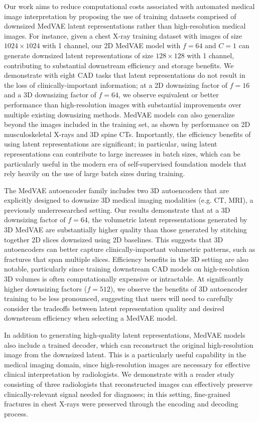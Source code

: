 Our work aims to reduce computational costs associated with automated medical image interpretation by proposing the use of training datasets comprised of downsized MedVAE latent representations rather than high-resolution medical images. For instance, given a chest X-ray training dataset with images of size $1024 \times 1024$ with 1 channel, our 2D MedVAE model with $f=64$ and $C=1$ can generate downsized latent representations of size $128 \times 128$ with 1 channel, contributing to substantial downstream efficiency and storage benefits. We demonstrate with eight CAD tasks that latent representations do not result in the loss of clinically-important information; at a 2D downsizing factor of $f=16$ and a 3D downsizing factor of $f=64$, we observe equivalent or better performance than high-resolution images with substantial improvements over multiple existing downsizing methods. MedVAE models can also generalize beyond the images included in the training set, as shown by performance on 2D musculoskeletal X-rays and 3D spine CTs. Importantly, the efficiency benefits of using latent representations are significant; in particular, using latent representations can contribute to large increases in batch sizes, which can be particularly useful in the modern era of self-supervised foundation models that rely heavily on the use of large batch sizes during training. 

The MedVAE autoencoder family includes two 3D autoencoders that are explicitly designed to downsize 3D medical imaging modalities (e.g. CT, MRI), a previously underresearched setting. Our results demonstrate that at a 3D downsizing factor of $f=64$, the volumetric latent representations generated by 3D MedVAE are substantially higher quality than those generated by stitching together 2D slices downsized using 2D baselines. This suggests that 3D autoencoders can better capture clinically-important volumetric patterns, such as fractures that span multiple slices. Efficiency benefits in the 3D setting are also notable, particularly since training downstream CAD models on high-resolution 3D volumes is often computationally expensive or intractable. At significantly higher downsizing factors ($f=512$), we observe the benefits of 3D autoencoder training to be less pronounced, suggesting that users will need to carefully consider the tradeoffs between latent representation quality and desired downstream efficiency when selecting a MedVAE model.

In addition to generating high-quality latent representations, MedVAE models also include a trained decoder, which can reconstruct the original high-resolution image from the downsized latent. This is a particularly useful capability in the medical imaging domain, since high-resolution images are necessary for effective clinical interpretation by radiologists. We demonstrate with a reader study consisting of three radiologists that reconstructed images can effectively preserve clinically-relevant signal needed for diagnoses; in this setting, fine-grained fractures in chest X-rays were preserved through the encoding and decoding process.

